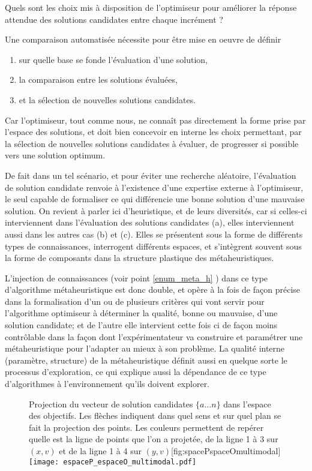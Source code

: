 Quels sont les choix mis à disposition de l'optimiseur pour améliorer la réponse attendue des solutions candidates entre chaque incrément ? \autocite[19]{Weise2011}

Une comparaison automatisée nécessite pour être mise en oeuvre de définir \begin{enumerate}[label=(\alph*)]
\item sur quelle base se fonde l'évaluation d'une solution,
\item la comparaison entre les solutions évaluées,
\item et la sélection de nouvelles solutions candidates.\end{enumerate}

Car l'optimiseur, tout comme nous, ne connaît pas directement la forme prise par l'espace des solutions, et doit bien concevoir en interne les choix permettant, par la sélection de nouvelles solutions candidates à évaluer, de progresser si possible vers une solution optimum.

De fait dans un tel scénario, et pour éviter une recherche aléatoire, l'évaluation de solution candidate renvoie à l'existence d'une expertise externe à l'optimiseur, le seul capable de formaliser ce qui différencie une bonne solution d'une mauvaise solution. On revient à parler ici d'heuristique, et de leurs diversités, car si celles-ci interviennent dans l'évaluation des solutions candidates (a), elles interviennent aussi dans les autres cas (b) et (c). Elles se présentent sous la forme de différents types de connaissances, interrogent différents espaces, et s'intègrent souvent sous la forme de composants dans la structure plastique des métaheuristiques.

L'injection de connaissances (voir point \ref{enum_meta_h} ) dans ce type d'algorithme métaheuristique est donc double, et opère à la fois de façon précise dans la formalisation d'un ou de plusieurs critères qui vont servir pour l'algorithme optimiseur à déterminer la qualité, bonne ou mauvaise, d'une solution candidate; et de l'autre elle intervient cette fois ci de façon moins contrôlable dans la façon dont l'expérimentateur va construire et paramétrer une métaheuristique pour l'adapter au mieux à son problème. La qualité interne (paramètre, structure) de la métaheuristique définit aussi en quelque sorte le processus d'exploration, ce qui explique aussi la dépendance de ce type d'algorithmes à l'environnement qu'ils doivent explorer.

\begin{figure}[!htb]
	\begin{sidecaption}{Projection du vecteur de solution candidates $\{a \dotsc n\}$ dans l'espace des objectifs. Les flèches indiquent dans quel sens et sur quel plan se fait la projection des points. Les couleurs permettent de repérer quelle est la ligne de points que l'on a projetée, de la ligne 1 à 3 sur $(x,v)$ et de la ligne 1 à 4 sur $(y,v)$}[fig:spacePspaceOmultimodal]
	 \centering
	 	\texttt{[image: espaceP\_espaceO\_multimodal.pdf]}
	\end{sidecaption}
\end{figure}

